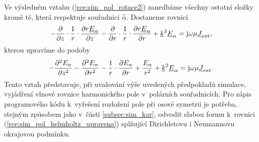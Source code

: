 Ve výsledném vztahu (\ref{rce:sim_pol_rotace2}) zanedbáme všechny ostatní složky kromě té, která respektuje souřadnici $\hat{\alpha}$. Dostaneme rovnici
\begin{displaymath}
-\frac{\partial}{\partial z}\cdot\frac{1}{r}\cdot\frac{\partial r{\underline{E}}_{\alpha}}{\partial z} - \frac{\partial}{\partial r}\cdot\frac{1}{r}\cdot\frac{\partial r{\underline{E}}_{\alpha}}{\partial r}+{\underline{k}}^{2}{\underline{E}}_{\alpha} = \mathrm{j}\omega\mu{\underline{J}}_{\mathrm{ext}},
\end{displaymath}
kterou upravíme do podoby
\begin{equation}
-\frac{\partial^{2}E_{\alpha}}{\partial z^{2}}-\frac{\partial^{2}E_{\alpha}}{\partial r^{2}}-\frac{1}{r}\cdot\frac{\partial E_{\alpha}}{\partial r} + \frac{E_{\alpha}}{r^{2}} +{\underline{k}}^{2}{\underline{E}}_{\alpha} = \mathrm{j}\omega\mu{\underline{J}}_{\mathrm{ext}}.
	\label{rce:sim_pol_helmholtz_upravena}
\end{equation}
Tento vztah představuje, při uvažování výše uvedených předpokladů simulace, vyjádření vlnové rovnice harmonického pole v~polárních souřadnicích. Pro zápis programového kódu k~vyřešení rozložení pole při osové symetrii je potřeba, stejným způsobem jako v~části \ref{subsec:sim_kar}, odvodit slabou formu k~rovnici (\ref{rce:sim_pol_helmholtz_upravena}) splňující Dirichletovu i Neumannovu okrajovou podmínku. 

